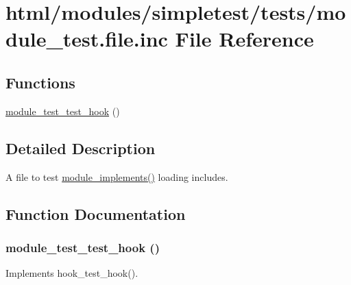 \hypertarget{module__test_8file_8inc}{
\section{html/modules/simpletest/tests/module\_\-test.file.inc File Reference}
\label{module__test_8file_8inc}
}
\subsection*{Functions}
\begin{DoxyCompactItemize}
\item 
\hyperlink{module__test_8file_8inc_a7a9be3d8128365a6259cb1d6d322cf64}{module\_\-test\_\-test\_\-hook} ()
\end{DoxyCompactItemize}


\subsection{Detailed Description}
A file to test \hyperlink{group__hooks_ga9191200072f2a641829e9d3c2759561f}{module\_\-implements()} loading includes. 

\subsection{Function Documentation}
\hypertarget{module__test_8file_8inc_a7a9be3d8128365a6259cb1d6d322cf64}{
\subsubsection[{module\_\-test\_\-test\_\-hook}]{\setlength{\rightskip}{0pt plus 5cm}module\_\-test\_\-test\_\-hook ()}}
\label{module__test_8file_8inc_a7a9be3d8128365a6259cb1d6d322cf64}
Implements hook\_\-test\_\-hook(). 